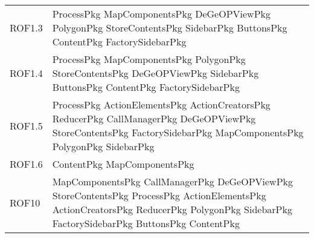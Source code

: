 \begin{longtable}{p{2.5cm}!{\VRule[1pt]}p{5cm}}
		ROF1.3 & ProcessPkg \newline MapComponentsPkg \newline DeGeOPViewPkg \newline PolygonPkg \newline StoreContentsPkg \newline SidebarPkg \newline ButtonsPkg \newline ContentPkg \newline FactorySidebarPkg\\
		ROF1.4 & ProcessPkg \newline MapComponentsPkg \newline PolygonPkg \newline StoreContentsPkg \newline DeGeOPViewPkg \newline SidebarPkg \newline ButtonsPkg \newline ContentPkg \newline FactorySidebarPkg\\
		ROF1.5 & ProcessPkg \newline ActionElementsPkg \newline ActionCreatorsPkg \newline ReducerPkg \newline CallManagerPkg \newline DeGeOPViewPkg \newline StoreContentsPkg \newline FactorySidebarPkg \newline MapComponentsPkg \newline PolygonPkg \newline SidebarPkg\\
		ROF1.6 & ContentPkg \newline MapComponentsPkg\\
		ROF10 & MapComponentsPkg \newline CallManagerPkg \newline DeGeOPViewPkg \newline StoreContentsPkg \newline ProcessPkg \newline ActionElementsPkg \newline ActionCreatorsPkg \newline ReducerPkg \newline PolygonPkg \newline SidebarPkg \newline FactorySidebarPkg \newline ButtonsPkg \newline ContentPkg\\

\end{longtable}

